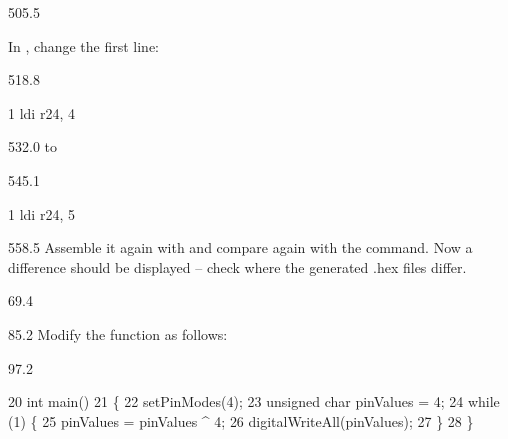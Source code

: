 \documentclass{aslab}
\makeatletter
\newcommand*\aN[1]{\textcolor{codeorange}{#1}}%
\newcommand*\aI[1]{\textcolor{codegreen}{#1}}%
\newcommand*\aK[1]{\textcolor{codered}{#1}}%
\newcommand*\aR[1]{\textcolor{codecyan}{#1}}%
\newenvironment{asmlisting}[1][11]{\par
  \edef\asm@bs{\the\baselineskip}\fontsize{#1bp}{\asm@bs}\selectfont
  \ttfamily\asm@setup}{\par}
\makeatother
\begin{document}
\begin{region}[x=74.7,right=0]{505.5}
\begin{alphasub}[start=2]
\item In , change the first line:
\end{alphasub}
\end{region}

\begin{region}[x=92.7,right=0]{518.8}
\begin{asmlisting}[9]
\aN{1}         \aI{ldi}     \aR{r24},    \aK{4}
\end{asmlisting}
\end{region}

\begin{region}[x=92.7,right=0]{532.0}
to
\end{region}

\begin{region}[x=92.7,right=0]{545.1}
\begin{asmlisting}[9]
\aN{1}         \aI{ldi}     \aR{r24},    \aK{5}
\end{asmlisting}
\end{region}

\begin{region}[x=92.7,right=0,pitch=13.25]{558.5}
Assemble it again with  and compare again with the
 command. Now a difference should be displayed -- check where the
generated .hex files differ.
\end{region}

\nextpage
\begin{region}{69.4}
\end{region}

\begin{region}{85.2}
Modify the function  as follows:
\end{region}

\begin{region}[pitch=10]{97.2}
\begin{asmlisting}[9]
 \aN{20} \aI{int} main()
 \aN{21} \{
 \aN{22}     setPinModes(\aK{4});
 \aN{23}     \aI{unsigned} \aI{char} pinValues = \aK{4};
 \aN{24}     \aN{while} (\aK{1}) \{
 \aN{25}         pinValues = pinValues \textasciicircum{} \aK{4};
 \aN{26}         digitalWriteAll(pinValues);
 \aN{27}     \}
 \aN{28} \}
\end{asmlisting}
\end{region}
\end{document}
